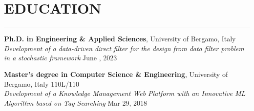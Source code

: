 \documentclass[10pt]{article}
\newcommand{\cvsection}[1]{\section*{\centering\normalsize\uppercase{#1}}\vspace{-16pt}\rule{\linewidth}{0.2pt}\vspace{6pt}}
\begin{document}
\cvsection{education}
\textbf{Ph.D. in Engineering \& Applied Sciences}, University of Bergamo, Italy\\
\textit{Development of a data-driven direct filter for the design from data filter problem in a stochastic framework} \hfill June , 2023\\

\vspace{-6pt}

\textbf{Master's degree in Computer Science \& Engineering}, University of Bergamo, Italy \hfill 110L\slash110\\
\textit{Development of a Knowledge Management Web Platform with an Innovative ML Algorithm based on Tag Searching} \hfill Mar 29, 2018\\
\end{document}

